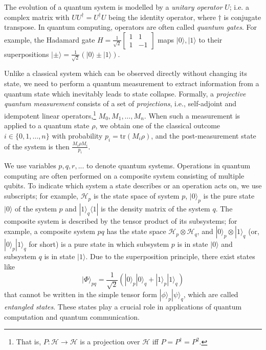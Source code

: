 \documentclass[conference,compsoc, 10pt]{IEEEtran}
\newcommand {\cH } {{\mathcal{H}}}
\def\>{\ensuremath{\rangle}}
\def\<{\ensuremath{\langle}}
\begin{document}
  The evolution of a quantum system is modelled by a \emph{unitary operator}
  $U$; i.e.  a complex matrix with $UU^\dag=U^\dag U$ being the identity
  operator, where $\dag$ is conjugate transpose. In quantum computing, operators
  are often called \emph{quantum gates}. For example, the Hadamard gate
      $H=\frac{1}{\sqrt{2}}\left[\begin{array}{cc} 1 & 1 \\ 1 & -1
      \end{array}\right]$ maps $|0\>, |1\>$ to their superpositions
      $|\pm\>=\frac{1}{\sqrt{2}}(|0\>\pm|1\>)$.
	
  Unlike a classical system which can be observed directly without changing its
  state, we need to perform a quantum measurement to extract information from a
  quantum state which inevitably leads to state collapse. Formally, a
  \emph{projective quantum measurement} consists of a set of \emph{projections},
  i.e., self-adjoint and idempotent linear operators,\footnote{That is,
  $P:\cH\rightarrow\cH$ is a projection over $\cH$ iff $P = P^\dag = P^2$.}
  $M_0,M_1,\dots, M_n$. When such a measurement is applied to a quantum state
  $\rho$, we obtain one of the classical outcome $i\in\{0,1,\dots,n\}$ with
  probability $p_i = \mathrm{tr}(M_i\rho)$, and the post-measurement state of
  the system is then  $\frac{M_i\rho M_i}{p_i}$.
	
	We use variables $p,q,r, ...$ to denote quantum systems. Operations in quantum
  computing are often performed on a composite system consisting of multiple
  qubits. To indicate which system a state describes or an operation acts on, we
  use subscripts; for example, $\cH_p$ is the state space of system $p$,
  $|0\>_{p}$ is the pure state $|0\>$ of the system $p$ and $|1\>_{q}\<1|$ is
  the density matrix of the system $q$. The composite system is described by the
  tensor product of its subsystems; for example, a composite system $pq$ has the
  state space $\cH_p\otimes\cH_q$, and $|0\>_p\otimes|1\>_q$ (or, $|0\>_p|1\>_q$
  for short) is a pure state in which  subsystem $p$ is in state $|0\>$ and
  subsystem $q$ is in state $|1\>$. Due to the superposition principle, there
  exist states like $$|\Phi\>_{pq} =
  \frac{1}{\sqrt{2}}(|0\>_p|0\>_q+|1\>_p|1\>_q)$$ that cannot be written in the
  simple tensor form $|\phi\>_p|\psi\>_q$, which are called \emph{entangled
  states}. These states play a crucial role in applications of quantum
  computation and quantum communication. 
	
\end{document}

